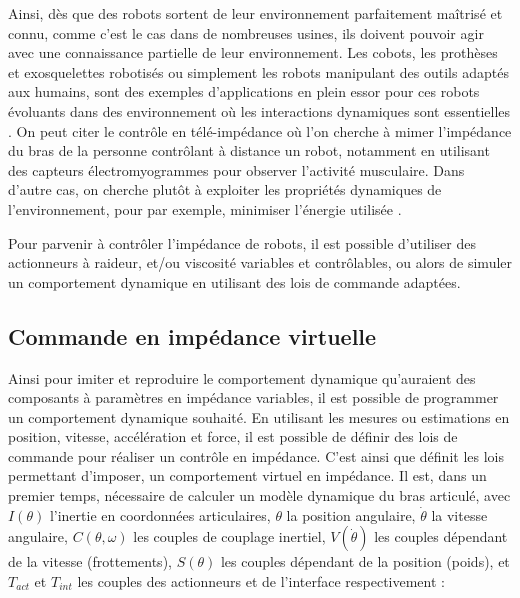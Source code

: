 \documentclass[12pt, a4paper]{article} %
\begin{document}
\newlineBlank

Ainsi, dès que des robots sortent de leur environnement parfaitement maîtrisé et connu, comme c'est le cas dans de nombreuses usines, ils doivent pouvoir agir avec une connaissance partielle de leur environnement. Les cobots, les prothèses et exosquelettes robotisés ou simplement les robots manipulant des outils adaptés aux humains, sont des exemples d'applications en plein essor pour ces robots évoluants dans des environnement où les interactions dynamiques sont essentielles \citep{sensinger_user-modulated_2008, burdet_interaction_2014, erden_hand_2015, cherubini_collaborative_2016, li_adaptive_2017}. On peut citer le contrôle en télé-impédance \citep{ajoudani_tele-impedance_2011, ajoudani_tele-impedance_2012} où l'on cherche à mimer l'impédance du bras de la personne contrôlant à distance un robot, notamment en utilisant des capteurs électromyogrammes pour observer l'activité musculaire. Dans d'autre cas, on cherche plutôt à exploiter les propriétés dynamiques de l'environnement, pour par exemple, minimiser l'énergie utilisée \citep{haddadin_exploiting_2011}.

\newlineBlank

Pour parvenir à contrôler l'impédance de robots, il est possible d'utiliser des actionneurs à raideur, et/ou viscosité variables et contrôlables, ou alors de simuler un comportement dynamique en utilisant des lois de commande adaptées.



\subsection{Commande en impédance virtuelle}


Ainsi pour imiter et reproduire le comportement dynamique qu'auraient des composants à paramètres en impédance variables, il est possible de programmer un comportement dynamique souhaité. En utilisant les mesures ou estimations en position, vitesse, accélération et force, il est possible de définir des lois de commande pour réaliser un contrôle en impédance. C'est ainsi que \cite{hogan_impedance_1985} définit les lois permettant d'imposer, un comportement virtuel en impédance. Il est, dans un premier temps, nécessaire de calculer un modèle dynamique du bras articulé, avec $I(\theta)$ l'inertie en coordonnées articulaires, $\theta$ la position angulaire, $\dot{\theta}$ la vitesse angulaire, $C(\theta, \omega)$ les couples de couplage inertiel, $V(\dot{\theta})$ les couples dépendant de la vitesse (frottements), $S(\theta)$ les couples dépendant de la position (poids), et $T_{act}$ et $T_{int}$ les couples des actionneurs et de l'interface respectivement :
\end{document}
